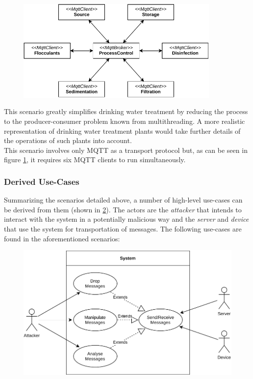 \begin{figure}[h!]
    \centering
    \includegraphics[width=10cm]{img/ch04/Scenario_WTP.pdf}
    \label{fig:arch-water-treatment}
\end{figure}
This scenario greatly simplifies drinking water treatment by reducing the process to the producer-consumer problem known from multithreading. A more realistic representation of drinking water treatment plants would take further details of the operations of such plants into account.\\
This scenario involves only \ac{MQTT} as a transport protocol but, as can be seen in figure \ref{fig:arch-water-treatment}, it requires six \ac{MQTT} clients to run simultaneously.

\subsubsection{Derived Use-Cases} Summarizing the scenarios detailed above, a number of high-level use-cases can be derived from them (shown in \ref{fig:use-cases-scenarios}). The actors are the \emph{attacker} that intends to interact with the system in a potentially malicious way and the \emph{server} and \emph{device} that use the system for transportation of messages. The following use-cases are found in the aforementioned scenarios:

\begin{figure}[h]
    \centering
    \includegraphics[width=14cm]{img/ch04/UseCases_Scenarios.pdf}
    \label{fig:use-cases-scenarios}
\end{figure}


